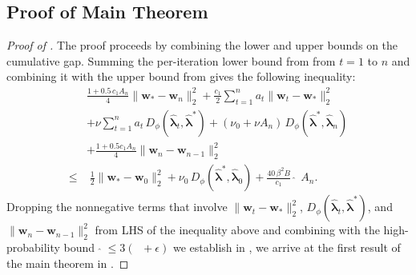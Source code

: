 \documentclass[11pt]{article}
\newcounter{thm}
\numberwithin{thm}{section}
\theoremstyle{plain}
\theoremstyle{definition}
\theoremstyle{remark} \newtheorem{remark}[thm]{Remark}
\def\vlambda{{\bm{\lambda}}}
\def\vw{{\bm{w}}}
\newcommand{\evlambda}{\widehat{\vlambda}}
\DeclareMathOperator{\mOPT}{OPT_m}
\newcommand{\mOPThat}{\widehat{\mOPT}}
\begin{document}
\subsection{Proof of Main Theorem}
\label{subsec:proof-main-theorem}


\begin{proof}[Proof of ]
The proof proceeds by combining the lower and upper bounds on the cumulative gap. Summing the per-iteration lower bound from  from $t=1$ to $n$ and combining it with the upper bound from  gives the following inequality:
\begin{align*}
 \; &\frac{1+0.5\,c_1A_n}{4}\|\vw_*-\vw_n\|_2^2
+\frac{c_1}{2}\sum_{t=1}^na_t\|\vw_t-\vw_*\|_2^2\\
&+ \nu\sum_{t=1}^n a_t\,D_{\phi}(\evlambda_t,\evlambda^*)
+ (\nu_0+\nu A_n)\,D_{\phi}(\evlambda^*,\evlambda_n)\\
&+\frac{1+0.5c_1A_n}{4}\|\vw_n-\vw_{n-1}\|_2^2 \\
\le &\; 
\tfrac12\|\vw_*-\vw_0\|_2^2+\nu_0\,D_{\phi}(\evlambda^*,\evlambda_0)
+ \frac{40\,\beta^2B}{c_1}\,\mOPThat\,A_n.   
\end{align*}
Dropping the nonnegative terms that involve $\|\vw_t-\vw_*\|_2^2$, $D_{\phi}(\evlambda_t,\evlambda^*)$, and \(\|\vw_n-\vw_{n-1}\|_2^2\) from LHS of the inequality above and combining with the high-probability bound $\mOPThat \le 3(\mOPT+\epsilon)$ we establish in , we arrive at the first result of the main theorem in . 


\end{proof}
\end{document}
